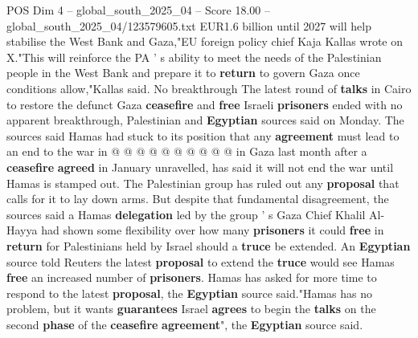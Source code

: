 \begin{textsample}{POS Dim 4 – global\_south\_2025\_04 – Score 18.00 – global\_south\_2025\_04/123579605.txt}
EUR1.6 billion until 2027 will help stabilise the West Bank and Gaza,"EU foreign policy chief Kaja Kallas wrote on X."This will reinforce the PA ' s ability to meet the needs of the Palestinian people in the West Bank and prepare it to \textbf{return} to govern Gaza once conditions allow,"Kallas said.
No breakthrough The latest round of \textbf{talks} in Cairo to restore the defunct Gaza \textbf{ceasefire} and \textbf{free} Israeli \textbf{prisoners} ended with no apparent breakthrough, Palestinian and \textbf{Egyptian} sources said on Monday.
The sources said Hamas had stuck to its position that any \textbf{agreement} must lead to an end to the war in @ @ @ @ @ @ @ @ @ @ in Gaza last month after a \textbf{ceasefire} \textbf{agreed} in January unravelled, has said it will not end the war until Hamas is stamped out.
The Palestinian group has ruled out any \textbf{proposal} that calls for it to lay down arms.
But despite that fundamental disagreement, the sources said a Hamas \textbf{delegation} led by the group ' s Gaza Chief Khalil Al-Hayya had shown some flexibility over how many \textbf{prisoners} it could \textbf{free} in \textbf{return} for Palestinians held by Israel should a \textbf{truce} be extended.
An \textbf{Egyptian} source told Reuters the latest \textbf{proposal} to extend the \textbf{truce} would see Hamas \textbf{free} an increased number of \textbf{prisoners}.
Hamas has asked for more time to respond to the latest \textbf{proposal}, the \textbf{Egyptian} source said."Hamas has no problem, but it wants \textbf{guarantees} Israel \textbf{agrees} to begin the \textbf{talks} on the second \textbf{phase} of the \textbf{ceasefire} \textbf{agreement}", the \textbf{Egyptian} source said.

\end{textsample}

